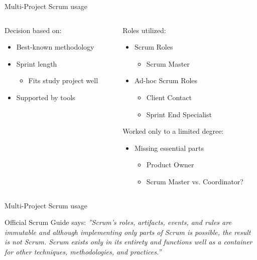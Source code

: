\begin{frame}{Multi-Project Scrum usage}
  \begin{columns}
  		\begin{column}{0.5\textwidth}
  			Decision based on:
  			\begin{itemize}
      		\item Best-known methodology
      		\item Sprint length
        		\begin{itemize}
        		\item Fits study project well
        		\end{itemize}
      		\item Supported by tools 
        \end{itemize}
  		\end{column}
  		
  		\pause
  		
  		\begin{column}{0.5\textwidth}
        Roles utilized:	
  	    \begin{itemize}
      	  \item Scrum Roles
        	  \begin{itemize}
        	    \item Scrum Master
        	  \end{itemize}
      		\item Ad-hoc Scrum Roles
        		\begin{itemize}
  	      		\item Client Contact
  	      		\item Sprint End Specialist
        		\end{itemize}
      	\end{itemize}
      	\pause
  	    \linespace
  			Worked only to a limited degree:
  			\begin{itemize}
  				\item Missing essential parts
    				\begin{itemize}
    				\item Product Owner
    				\item Scrum Master vs. Coordinator?
    				\end{itemize}
  			\end{itemize}
  		\end{column}
  \end{columns}
\end{frame}

\begin{frame}{Multi-Project Scrum usage}
  \begin{block}{Official Scrum Guide says:}
  \textit{''Scrum’s roles, artifacts, events, and rules are immutable and although implementing only parts of Scrum is possible, the result is not Scrum. 
  Scrum exists only in its entirety and functions well as a container for other techniques, methodologies, and practices.''}
  \end{block}
\end{frame}

